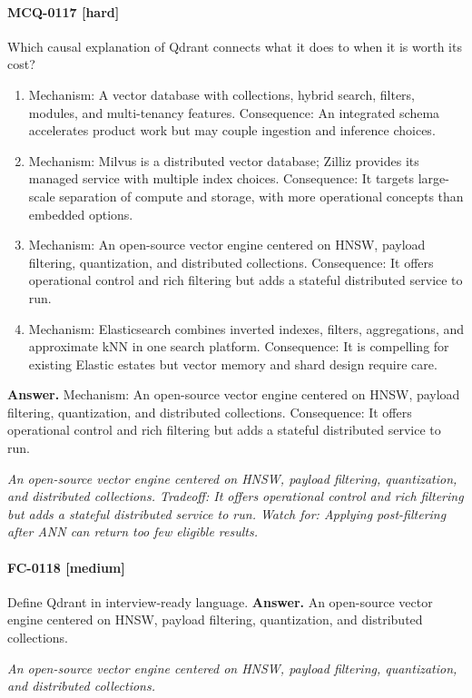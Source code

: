 \paragraph{MCQ-0117 [hard]} Which causal explanation of Qdrant connects what it does to when it is worth its cost?
\begin{enumerate}[label=\Alph*.]
\item Mechanism: A vector database with collections, hybrid search, filters, modules, and multi-tenancy features. Consequence: An integrated schema accelerates product work but may couple ingestion and inference choices.
\item Mechanism: Milvus is a distributed vector database; Zilliz provides its managed service with multiple index choices. Consequence: It targets large-scale separation of compute and storage, with more operational concepts than embedded options.
\item Mechanism: An open-source vector engine centered on HNSW, payload filtering, quantization, and distributed collections. Consequence: It offers operational control and rich filtering but adds a stateful distributed service to run.
\item Mechanism: Elasticsearch combines inverted indexes, filters, aggregations, and approximate kNN in one search platform. Consequence: It is compelling for existing Elastic estates but vector memory and shard design require care.
\end{enumerate}
\noindent\textbf{Answer.} Mechanism: An open-source vector engine centered on HNSW, payload filtering, quantization, and distributed collections. Consequence: It offers operational control and rich filtering but adds a stateful distributed service to run.
\par\textit{An open-source vector engine centered on HNSW, payload filtering, quantization, and distributed collections. Tradeoff: It offers operational control and rich filtering but adds a stateful distributed service to run. Watch for: Applying post-filtering after ANN can return too few eligible results.}
\paragraph{FC-0118 [medium]} Define Qdrant in interview-ready language.
\noindent\textbf{Answer.} An open-source vector engine centered on HNSW, payload filtering, quantization, and distributed collections.
\par\textit{An open-source vector engine centered on HNSW, payload filtering, quantization, and distributed collections.}
